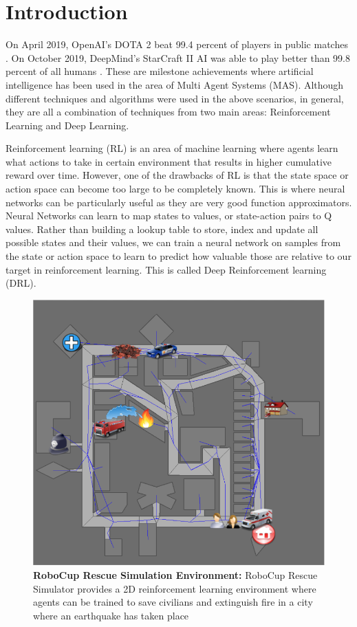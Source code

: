 \documentclass[12pt]{report}
\begin{document}
\chapter{Introduction}            




On April 2019, OpenAI's DOTA 2 beat 99.4 percent of players in public matches \cite{dota2}. On October 2019, DeepMind's StarCraft II AI was able to play better than 99.8 percent of all humans \cite{Starcraft2}. These are milestone achievements where artificial intelligence has been used in the area of Multi Agent Systems (MAS). Although different techniques and algorithms were used in the above scenarios, in general, they are all a combination of techniques from two main areas: Reinforcement Learning and Deep Learning. 

Reinforcement learning (RL) is an area of machine learning where agents learn what actions to take in certain environment that results in higher cumulative reward over time. However, one of the drawbacks of RL is that the state space or action space can become too large to be completely known. This is where neural networks can be particularly useful as they are very good function approximators. Neural Networks can learn to map states to values, or state-action pairs to Q values. Rather than building a lookup table to store, index and update all possible states and their values, we can train a neural network on samples from the state or action space to learn to predict how valuable those are relative to our target in reinforcement learning. This is called Deep Reinforcement learning (DRL). 

\begin{figure}[!h]
    \centering
    \includegraphics[width=12cm]{10.png}
    \caption{\textbf{RoboCup Rescue Simulation Environment:} RoboCup Rescue Simulator provides a 2D reinforcement learning environment where agents can be trained to save civilians and extinguish fire in a city where an earthquake has taken place}
    \label{fig:x}
\end{figure}
\end{document}
